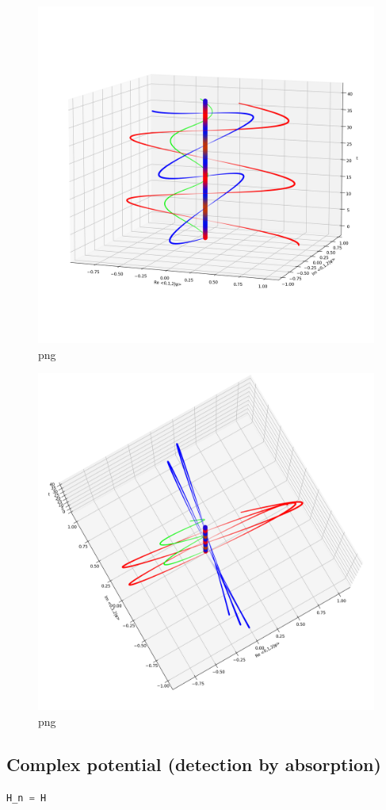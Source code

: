 \begin{figure}
\centering
\includegraphics[width=0.666\linewidth]{tex/appendix/nb/jupyter/3lev/output_22_0.png}
\caption{png}
\end{figure}

\begin{figure}
\centering
\includegraphics[width=0.666\linewidth]{tex/appendix/nb/jupyter/3lev/output_22_1.png}
\caption{png}
\end{figure}

\hypertarget{complex-potential-detection-by-absorption}{%
\subsection{Complex potential (detection by
absorption)}\label{complex-potential-detection-by-absorption}}

\begin{lstlisting}[language=Python]
H_n = H
\end{lstlisting}

